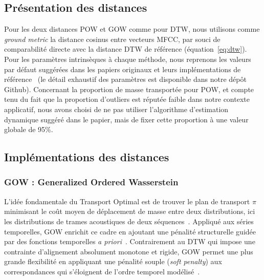 \documentclass{article}
\begin{document}
\subsection{Présentation des distances}
\label{sec:presentation_distances}

Pour les deux distances POW et GOW comme pour DTW, nous utilisons comme
\textit{ground metric} la distance cosinus entre vecteurs MFCC, par souci de
comparabilité directe avec la distance DTW de référence (équation~\ref{eq:dtw}).
Pour les paramètres intrinsèques à chaque méthode, nous reprenons les valeurs
par défaut suggérées dans les papiers originaux et leurs implémentations de
référence~\cite{pow2024,gow2025,github_pow,github_gow} (le
détail exhaustif des paramètres est disponible dans notre dépôt
Github).
Concernant la proportion de masse transportée pour POW, et compte tenu du
fait que la proportion d'outliers est réputée faible dans notre contexte
applicatif, nous avons choisi de ne pas utiliser l'algorithme d'estimation
dynamique suggéré dans le papier, mais de fixer cette proportion à une
valeur globale de 95\%.

\subsection{Implémentations des distances}

\subsubsection{GOW : Generalized Ordered Wasserstein}

L'idée fondamentale du Transport Optimal est de trouver le plan de transport
$\pi$ minimisant le coût moyen de déplacement de masse entre deux
distributions, ici les distributions de trames acoustiques de deux
séquences~\cite{optimal_transport}. Appliqué aux séries temporelles, GOW
enrichit ce cadre en ajoutant une pénalité structurelle guidée par des
fonctions temporelles \textit{a priori}~\cite{gow2025}. Contrairement au DTW
qui impose une contrainte d'alignement absolument monotone et rigide, GOW
permet une plus grande flexibilité en appliquant une pénalité souple
(\textit{soft penalty}) aux correspondances qui s'éloignent de l'ordre
temporel modélisé~\cite{gow2025}.
\end{document}
